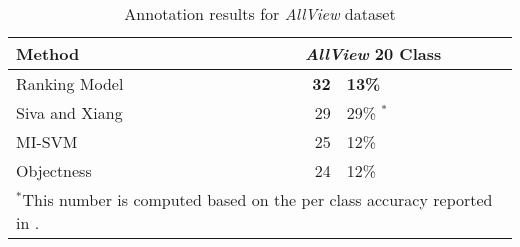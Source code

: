 \documentclass{bmvc2k}
\begin{document}
\begin{table}[h]
\begin{center}
\begin{tabular}{l r @{.} l}
\hline
\textbf{Method} & 
\multicolumn{2}{c}{ \textbf{\emph{AllView} 20 Class}} \\
\hline
Ranking Model & \quad \quad \quad \quad \textbf{32}&\textbf{13\%} \\
\hline
Siva and Xiang \cite{Sivaiccv2011} & 29&29\% $^{*}$ \\
\hline
MI-SVM \cite{Andrews03supportvector} & 25&12\%\\
\hline
Objectness \cite{Alexewhatisobject} & 24&12\%\\
\hline
\multicolumn{3}{l}{{\scriptsize$^{*}$This number is computed based on the per class accuracy reported in \cite{Sivaiccv2011}.}}
\end{tabular}

\end{center}

\caption{Annotation results for \emph{AllView} dataset}
\label{results_ranking}
\end{table}
\end{document}
